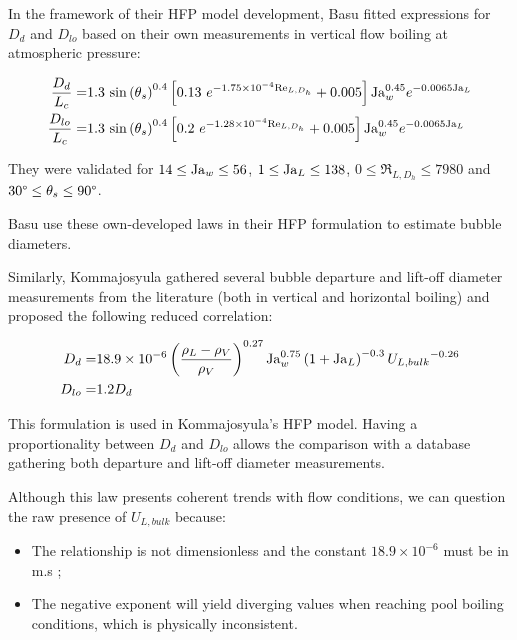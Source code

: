 \npar

In the framework of their HFP model development, Basu \etal fitted expressions for $D_{d}$ and $D_{lo}$ based on their own measurements in vertical flow boiling at atmospheric pressure:

\begin{align}
\frac{D_{d}}{L_{c}} =& 1.3~\sin{\theta_{s}}^{0.4}\crocht{ 0.13\ e^{-1.75\times 10^{-4} \Re_{L,D_{h}}}+0.005 }\Ja_{w}^{0.45}e^{-0.0065\Ja_{L}}
\label{eq:dd_basu}\\
%
\frac{D_{lo}}{L_{c}} =& 1.3~ \sin{\theta_{s}}^{0.4}\crocht{ 0.2\ e^{-1.28\times 10^{-4} \Re_{L,D_{h}}}+0.005 }\Ja_{w}^{0.45}e^{-0.0065\Ja_{L}}
\label{eq:dlo_basu}
\end{align}

They were validated for $14 \leq \mathrm{Ja}_{w} \leq 56$, $1 \leq \mathrm{Ja}_{L} \leq 138$, $0\leq \Re_{L,D_{h}} \leq 7980$ and $30\degree \leq \theta_{s} \leq 90 \degree$.


\begin{note*}{}
Basu \etal use these own-developed laws in their HFP formulation to estimate bubble diameters.
\end{note*}

\npar

Similarly, Kommajosyula\cite{kommajosyula_development_2020} gathered several bubble departure and lift-off diameter measurements from the literature (both in vertical and horizontal boiling) and proposed the following reduced correlation:

\begin{align}
D_{d} =& 18.9 \times 10^{-6} \left( \frac{\rho_{L}-\rho_{V}}{\rho_{V}} \right)^{0.27} \mathrm{Ja}_{w}^{0.75} \left( 1+\mathrm{Ja}_{L} \right)^{-0.3} {U_{L,bulk}}^{-0.26}
\label{eq:dd_komma} \\
D_{lo} =& 1.2 D_{d}
\label{eq:dlo_komma}
\end{align}

\begin{note*}{}
This formulation is used in Kommajosyula's HFP model. Having a proportionality between $D_{d}$ and $D_{lo}$ allows the comparison with a database gathering both departure and lift-off diameter measurements.
\end{note*}

Although this law presents coherent trends with flow conditions, we can question the raw presence of $U_{L,bulk}$ because:

\begin{itemize}
\item The relationship is not dimensionless and the constant $18.9 \times 10^{-6}$ must be in m.s ;
\item The negative exponent will yield diverging values when reaching pool boiling conditions, which is physically inconsistent.
\end{itemize}


